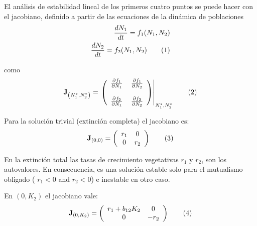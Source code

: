 El análisis de estabilidad lineal de los primeros cuatro puntos se puede hacer con el jacobiano, definido a partir de las ecuaciones de la dinámica de poblaciones
\begin{align*}
 \frac{dN_1}{dt} = f_1(N_1,N_2) \\
 \frac{dN_2}{dt} = f_2(N_1,N_2)
\stepcounter{equation}\tag{\theequation}\label{eq:Jacob00}
\end{align*}

\noindent como
\begin{equation}
\mathbf{J}_{\left(N^{*}_1,N^{*}_2\right)}= \left.\left(
  \begin{array}{cc}
    \frac{\partial f_1}{\partial N_1} \, & \frac{\partial f_1}{\partial N_2}\\
    \\
        \frac{\partial f_2}{\partial N_1} \,& \frac{\partial f_2}{\partial N_2}
    \end{array} \right)\right|_{N^{*}_1,N^{*}_2}
\stepcounter{equation}\tag{\theequation}\label{eq:Jacob00}
\end{equation}

Para la solución trivial (extinción completa) el jacobiano es:
\begin{equation}
\mathbf{J}_{\left(0,0\right)}= \left(
  \begin{array}{cc}
    r_1 & 0\\
    0 & r_2
    \end{array} \right)
\stepcounter{equation}\tag{\theequation}\label{eq:Jacob00}
\end{equation}

En la extinción total las tasas de crecimiento vegetativas $r_1$ y $r_2$, son los autovalores. En consecuencia, es una solución estable solo para el mutualismo obligado ( $r_{1}<0$ and $r_{2}<0$) e inestable en otro caso.

En $(0,K_2)$ el jacobiano vale:
\begin{equation}
\mathbf{J}_{\left(0,K_2\right)}= \left(
  \begin{array}{cc}
    r_1+b_{12}K_2 & 0\\
    0 & -r_2
    \end{array} \right)
\stepcounter{equation}\tag{\theequation}\label{eq:Jacob0K2}
\end{equation}

